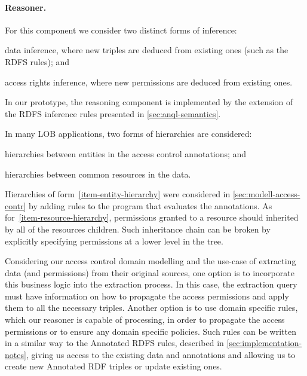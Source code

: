 \paragraph*{Reasoner.}
For this component we consider two distinct forms of inference:
% 
\begin{inparaenum}[(a)]
\item data inference, where new triples are deduced from existing ones (such as the \ac{RDFS} rules); and
\item access rights inference, where new permissions are deduced from existing ones.
\end{inparaenum}
% 
In our prototype, the reasoning component is implemented by the extension of the \ac{RDFS} inference rules presented in
\cref{sec:anql-semantics}.  


In many LOB applications, two forms of hierarchies are considered: 
%
\begin{inparaenum}[(i)]
\item\label{item-entity-hierarchy} hierarchies between entities in the access control annotations; and
\item\label{item-resource-hierarchy} hierarchies between common resources in the data.
\end{inparaenum}
%
Hierarchies of form~\eqref{item-entity-hierarchy} were considered in \cref{sec:modell-access-contr} by adding rules
to the \nrdn program that evaluates the annotations.
%
As for~\eqref{item-resource-hierarchy}, permissions granted to a resource should inherited by all of the resources
children.  Such inheritance chain can be broken by explicitly specifying permissions at a lower level in the tree. 

Considering our access control domain modelling and the use-case of extracting data (and permissions) from their
original sources, one option is to incorporate this business logic into the extraction process.  In this case, the
extraction query must have information on how to propagate the access permissions and apply them to all the necessary
triples.
%
Another option is to use domain specific rules, which our reasoner is capable of processing, in order to propagate the
access permissions or to ensure any domain specific policies.
%
Such rules can be written in a similar way to the Annotated RDFS rules, described in \cref{sec:implementation-notes},
giving us access to the existing data and annotations and allowing us to create new Annotated RDF triples or update
existing ones.


